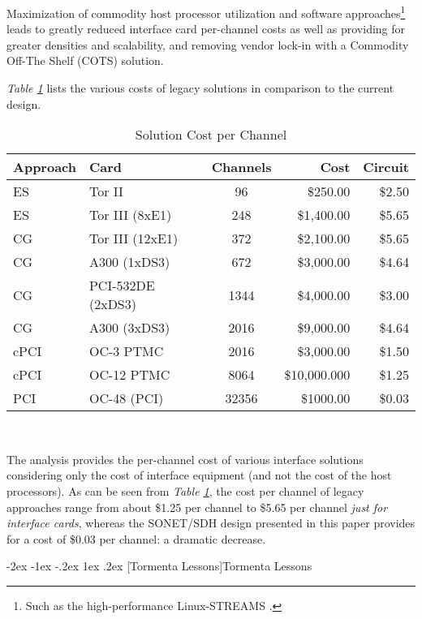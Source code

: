 \documentclass[letterpaper,final,notitlepage,twocolumn,10pt,twoside]{article}
\makeatletter
\let\large = \normalsize
\let\normalsize = \small
\let\small = \footnotesize
\let\footnotesize = \scriptsize
\let\scriptsize = \tiny
\renewcommand\section{\@startsection {section}{1}{\z@}%
                                   {-2ex \@plus -1ex \@minus -.2ex}%
                                   {1ex \@plus .2ex}%
                                   {\normalfont\large\bfseries}}
\makeatother
\begin{document}
Maximization of commodity host processor utilization and software
approaches\footnote{Such as the high-performance Linux-STREAMS \cite[]{LfS}.}
leads to greatly reduced interface card per-channel costs as well as providing
for greater densities and scalability, and removing vendor lock-in with a
Commodity Off-The Shelf (COTS) solution.

\textsl{Table \ref{table:channel}} lists the various costs of legacy solutions
in comparison to the current design.
\begin{table}[htp]
\footnotesize
\begin{center}
\setlength{\tabcolsep}{0.3em}
\setlength{\arraycolsep}{0.3em}
\begin{tabular}{llcrr}\\
Approach & Card & Channels & Cost & Circuit\\
\hline
ES & Tor II & 96 & \$250.00 & \$2.50\\
ES & Tor III (8xE1) & 248 & \$1,400.00 & \$5.65\\
CG & Tor III (12xE1) & 372 & \$2,100.00 & \$5.65\\
CG & A300 (1xDS3) & 672 & \$3,000.00 & \$4.64\\
CG & PCI-532DE (2xDS3) & 1344 & \$4,000.00 & \$3.00\\
CG & A300 (3xDS3) & 2016 & \$9,000.00 & \$4.64\\
cPCI & OC-3 PTMC & 2016 & \$3,000.00 & \$1.50\\
cPCI & OC-12 PTMC & 8064 & \$10,000.000 & \$1.25\\
\hline
PCI & OC-48 (PCI) & 32356 & \$1000.00 & \$0.03\\
\hline
\end{tabular}\\
\caption{Solution Cost per Channel}
\label{table:channel}
\end{center}
\normalsize
\end{table}
The analysis provides the per-channel cost of various interface solutions
considering only the cost of interface equipment (and not the cost of the host
processors).  As can be seen from \textsl{Table \ref{table:channel}}, the cost
per channel of legacy approaches range from about \$1.25 per channel to \$5.65
per channel \textit{just for interface cards}, whereas the SONET/SDH design
presented in this paper provides for a cost of \$0.03 per channel: a dramatic
decrease.

\section[Tormenta Lessons]{Tormenta Lessons}
\end{document}
